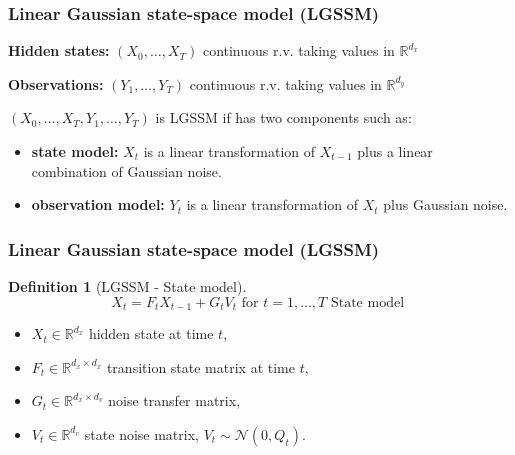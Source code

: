 \documentclass[xcolor=dvipsnames, compress]{beamer}
\newcommand{\R}{\ensuremath{\mathbb{R}}}
\newtheorem{defi}{Definition}[section]
\begin{document}
\begin{frame}
\frametitle{Linear Gaussian state-space model (LGSSM)}

\textbf{Hidden states:} $(X_0, \ldots, X_T)$ continuous r.v. taking values in $\R^{d_x}$

\textbf{Observations:} $(Y_1, \ldots, Y_T)$ continuous r.v. taking values in $\R^{d_y}$\vspace{0.5cm}

$(X_0, \ldots, X_T, Y_1, \ldots, Y_T)$ is LGSSM if has two components such as: 

\begin{itemize}
\item \textbf{state model:} $X_{t}$ is a linear transformation of $X_{t-1}$ plus a linear combination of Gaussian noise.\vspace{0.5cm}

\item \textbf{observation model:} $Y_{t}$ is a linear transformation of $X_{t}$ plus Gaussian noise.
\end{itemize}
\end{frame}

\begin{frame}
\frametitle{Linear Gaussian state-space model (LGSSM)}
\begin{defi}[LGSSM - State model]

\begin{equation}
X_t = F_t X_{t-1} + G_t V_t \mbox{ for } t=1, \ldots, T \mbox{ State model }
\end{equation}

\end{defi}

\begin{itemize}
	\item $X_t \in  \R^{d_x}$ hidden state at time $t$,
	\item $F_t \in  \R^{d_x \times d_x}$ transition state matrix at time $t$,
	\item $G_t \in  \R^{d_x \times d_v}$ noise transfer matrix,
	\item $V_t \in  \R^{d_v}$ state noise matrix, $V_t \sim \mathcal{N}(0,Q_t)$.
\end{itemize}

\end{frame}
\end{document}
